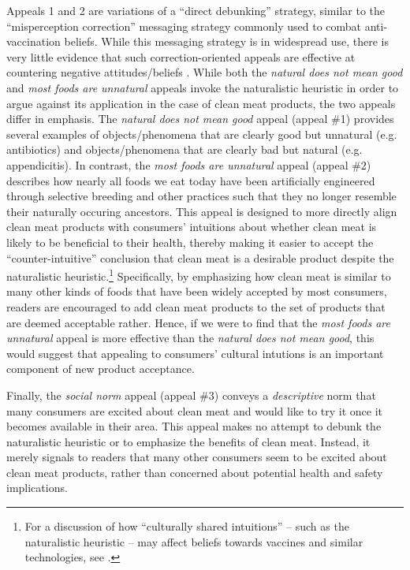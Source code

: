 \documentclass[12pt]{article}
\begin{document}
Appeals 1 and 2 are variations of a ``direct debunking'' strategy, similar to the ``misperception correction'' messaging strategy commonly used to combat anti-vaccination beliefs. While this messaging strategy is in widespread use, there is very little evidence that such correction-oriented appeals are effective at countering negative attitudes/beliefs \citep{Nyhan2015,Nyhan2014}. While both the \textit{natural does not mean good} and \textit{most foods are unnatural} appeals invoke the naturalistic heuristic in order to argue against its application in the case of clean meat products, the two appeals differ in emphasis. The \textit{natural does not mean good} appeal (appeal \#1) provides several examples of objects/phenomena that are clearly good but unnatural (e.g. antibiotics) and objects/phenomena that are clearly bad but natural (e.g. appendicitis). In contrast, the \textit{most foods are unnatural} appeal (appeal \#2) describes how nearly all foods we eat today have been artificially engineered through selective breeding and other practices such that they no longer resemble their naturally occuring ancestors. This appeal is designed to more directly align clean meat products with consumers' intuitions about whether clean meat is likely to be beneficial to their health, thereby making it easier to accept the ``counter-intuitive'' conclusion that clean meat is a desirable product despite the naturalistic heuristic.\footnote{For a discussion of how ``culturally shared intuitions'' -- such as the naturalistic heuristic -- may affect beliefs towards vaccines and similar technologies, see \citet{Miton2015}.} Specifically, by emphasizing how clean meat is similar to many other kinds of foods that have been widely accepted by most consumers, readers are encouraged to add clean meat products to the set of products that are deemed acceptable rather. Hence, if we were to find that the \textit{most foods are unnatural} appeal is more effective than the \textit{natural does not mean good}, this would suggest that appealing to consumers' cultural intutions is an important component of new product acceptance.

Finally, the \textit{social norm} appeal (appeal \#3) conveys a \textit{descriptive} norm that many consumers are excited about clean meat and would like to try it once it becomes available in their area. This appeal makes no attempt to debunk the naturalistic heuristic or to emphasize the benefits of clean meat. Instead, it merely signals to readers that many other consumers seem to be excited about clean meat products, rather than concerned about potential health and safety implications.
\end{document}
